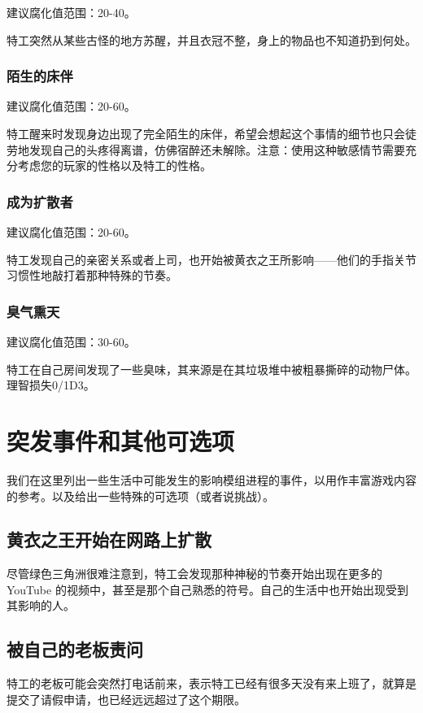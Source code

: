 建议腐化值范围：20-40。

特工突然从某些古怪的地方苏醒，并且衣冠不整，身上的物品也不知道扔到何处。

\subsection{陌生的床伴}

建议腐化值范围：20-60。

特工醒来时发现身边出现了完全陌生的床伴，希望会想起这个事情的细节也只会徒劳地发现自己的头疼得离谱，仿佛宿醉还未解除。注意：使用这种敏感情节需要充分考虑您的玩家的性格以及特工的性格。

\subsection{成为扩散者}

建议腐化值范围：20-60。

特工发现自己的亲密关系或者上司，也开始被黄衣之王所影响——他们的手指关节习惯性地敲打着那种特殊的节奏。

\subsection{臭气熏天}

建议腐化值范围：30-60。

特工在自己房间发现了一些臭味，其来源是在其垃圾堆中被粗暴撕碎的动物尸体。理智损失0/1D3。

\chapter{突发事件和其他可选项}

我们在这里列出一些生活中可能发生的影响模组进程的事件，以用作丰富游戏内容的参考。以及给出一些特殊的可选项（或者说挑战）。

\section{黄衣之王开始在网路上扩散}

尽管绿色三角洲很难注意到，特工会发现那种神秘的节奏开始出现在更多的 YouTube 的视频中，甚至是那个自己熟悉的符号。自己的生活中也开始出现受到其影响的人。

\section{被自己的老板责问}
特工的老板可能会突然打电话前来，表示特工已经有很多天没有来上班了，就算是提交了请假申请，也已经远远超过了这个期限。


